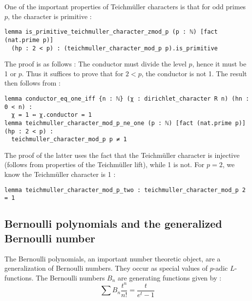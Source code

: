 \documentclass[11pt]{article}
\newcommand{\lean}[1]{\texttt{#1}\xspace} %
\begin{document}
One of the important properties of Teichmüller characters is that for odd primes $p$, the character is 
primitive : 
\begin{lstlisting}
lemma is_primitive_teichmuller_character_zmod_p (p : ℕ) [fact (nat.prime p)] 
  (hp : 2 < p) : (teichmuller_character_mod_p p).is_primitive
\end{lstlisting}
The proof is as follows : The conductor must divide the level $p$, hence it must be 1 or $p$. Thus it 
suffices to prove that for $2 < p$, the conductor is not 1. The result then follows from : 
\begin{lstlisting}
lemma conductor_eq_one_iff {n : ℕ} (χ : dirichlet_character R n) (hn : 0 < n) : 
  χ = 1 ↔ χ.conductor = 1 
lemma teichmuller_character_mod_p_ne_one (p : ℕ) [fact (nat.prime p)] (hp : 2 < p) :
  teichmuller_character_mod_p p ≠ 1
\end{lstlisting}
The proof of the latter uses the fact that the Teichmüller character is injective (follows from 
properties of the Teichmüller lift), while 1 is not. For $p = 2$, we know the Teichmüller character is 1 : 
\begin{lstlisting}
lemma teichmuller_character_mod_p_two : teichmuller_character_mod_p 2 = 1
\end{lstlisting}


\subsection{Bernoulli polynomials and the generalized Bernoulli number}
The Bernoulli polynomials, an important number theoretic object, are a generalization of
Bernoulli numbers. They occur as special values
of $p$-adic $L$-functions. The Bernoulli numbers $B_n$ are generating functions given by :
$$\sum B_n\frac{t^n}{n!}=\frac{t}{e^{t} - 1}$$
\end{document}
